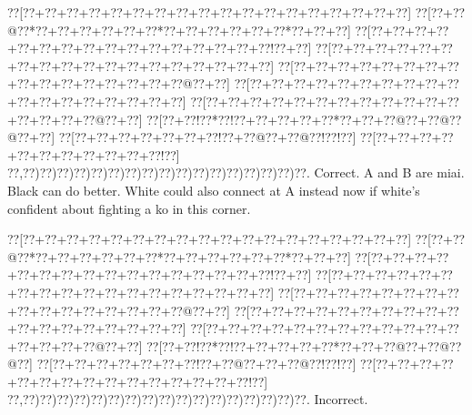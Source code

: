 \documentclass[a5paper]{article}
\begin{document}
\begin{center}
{\goo
\0??[\0??+\0??+\0??+\0??+\0??+\0??+\0??+\0??+\0??+\0??+\0??+\0??+\0??+\0??+\0??+\0??+\0??+\0??]
\0??[\0??+\0??@\0??*\0??+\0??+\0??+\0??+\0??+\0??*\0??+\0??+\0??+\0??+\0??+\0??*\0??+\0??+\0??]
\0??[\0??+\0??+\0??+\0??+\0??+\0??+\0??+\0??+\0??+\0??+\0??+\0??+\0??+\0??+\0??+\0??!\0??+\0??]
\0??[\0??+\0??+\0??+\0??+\0??+\0??+\0??+\0??+\0??+\0??+\0??+\0??+\0??+\0??+\0??+\0??+\0??+\0??]
\0??[\0??+\0??+\0??+\0??+\0??+\0??+\0??+\0??+\0??+\0??+\0??+\0??+\0??+\0??+\0??+\0??@\0??+\0??]
\0??[\0??+\0??+\0??+\0??+\0??+\0??+\0??+\0??+\0??+\0??+\0??+\0??+\0??+\0??+\0??+\0??+\0??+\0??]
\0??[\0??+\0??+\0??+\0??+\0??+\0??+\0??+\0??+\0??+\0??+\0??+\0??+\0??+\0??+\0??+\0??@\0??+\0??]
\0??[\0??+\0??!\0??*\0??!\0??+\0??+\0??+\0??+\0??*\0??+\0??+\0??@\0??+\0??@\0??@\0??+\0??]
\0??[\0??+\0??+\0??+\0??+\0??+\0??+\0??!\0??+\0??@\0??+\0??@\0??!\0??!\0??]
\0??[\0??+\0??+\0??+\0??+\0??+\0??+\0??+\0??+\0??+\0??+\0??!\0??]
\0??,\0??)\0??)\0??)\0??)\0??)\0??)\0??)\0??)\0??)\0??)\0??)\0??)\0??)\0??)\0??)\0??)\0??.
}
Correct. A and B are miai. Black can do better. White could also connect at A instead now if white's confident about fighting a ko in this corner.

\end{center}
\begin{center}
{\goo
\0??[\0??+\0??+\0??+\0??+\0??+\0??+\0??+\0??+\0??+\0??+\0??+\0??+\0??+\0??+\0??+\0??+\0??+\0??]
\0??[\0??+\0??@\0??*\0??+\0??+\0??+\0??+\0??+\0??*\0??+\0??+\0??+\0??+\0??+\0??*\0??+\0??+\0??]
\0??[\0??+\0??+\0??+\0??+\0??+\0??+\0??+\0??+\0??+\0??+\0??+\0??+\0??+\0??+\0??+\0??!\0??+\0??]
\0??[\0??+\0??+\0??+\0??+\0??+\0??+\0??+\0??+\0??+\0??+\0??+\0??+\0??+\0??+\0??+\0??+\0??+\0??]
\0??[\0??+\0??+\0??+\0??+\0??+\0??+\0??+\0??+\0??+\0??+\0??+\0??+\0??+\0??+\0??+\0??@\0??+\0??]
\0??[\0??+\0??+\0??+\0??+\0??+\0??+\0??+\0??+\0??+\0??+\0??+\0??+\0??+\0??+\0??+\0??+\0??+\0??]
\0??[\0??+\0??+\0??+\0??+\0??+\0??+\0??+\0??+\0??+\0??+\0??+\0??+\0??+\0??+\0??+\0??@\0??+\0??]
\0??[\0??+\0??!\0??*\0??!\0??+\0??+\0??+\0??+\0??*\0??+\0??+\0??@\0??+\0??@\0??@\0??]
\0??[\0??+\0??+\0??+\0??+\0??+\0??+\0??!\0??+\0??@\0??+\0??+\0??@\0??!\0??!\0??]
\0??[\0??+\0??+\0??+\0??+\0??+\0??+\0??+\0??+\0??+\0??+\0??+\0??+\0??+\0??+\0??!\0??]
\0??,\0??)\0??)\0??)\0??)\0??)\0??)\0??)\0??)\0??)\0??)\0??)\0??)\0??)\0??)\0??)\0??)\0??.
}
Incorrect. 

\end{center}
\end{document}
